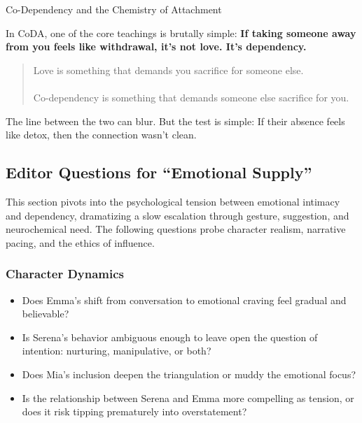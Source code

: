 \begin{PhilosophicalSidebar}{Co-Dependency and the Chemistry of Attachment}
    \medskip
    
    In CoDA, one of the core teachings is brutally simple:  
    \textbf{If taking someone away from you feels like withdrawal, it's not love. It's dependency.}
    
    \begin{quote}
        \centering
    Love is something that demands you sacrifice for someone else. \\\ \\
    Co-dependency is something that demands someone else sacrifice for you.
    \end{quote}
    
    \medskip
    
    The line between the two can blur.  
    But the test is simple:  
    If their absence feels like detox, then the connection wasn’t clean.

    \medskip

    
\end{PhilosophicalSidebar}


\subsection*{Editor Questions for ``Emotional Supply''}

This section pivots into the psychological tension between emotional intimacy and dependency, dramatizing a slow escalation through gesture, suggestion, and neurochemical need. The following questions probe character realism, narrative pacing, and the ethics of influence.

\subsubsection*{Character Dynamics}

\begin{itemize}
  \item Does Emma’s shift from conversation to emotional craving feel gradual and believable?
  \item Is Serena’s behavior ambiguous enough to leave open the question of intention: nurturing, manipulative, or both?
  \item Does Mia’s inclusion deepen the triangulation or muddy the emotional focus?
  \item Is the relationship between Serena and Emma more compelling as tension, or does it risk tipping prematurely into overstatement?
\end{itemize}

